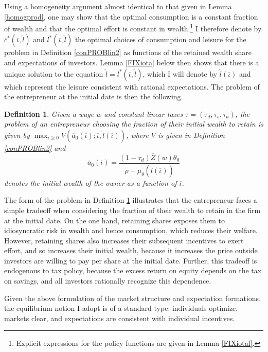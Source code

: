 \documentclass[11pt]{article}
\theoremstyle{plain}
\newtheorem{defn}{Definition}[section]
\begin{document}
Using a homogeneity argument almost identical to that given in Lemma \ref{homogprod}, one may show that the optimal consumption is a constant fraction of wealth and that the optimal effort is constant in wealth.\footnote{Explicit expressions for the policy functions are given in Lemma \ref{FIXiotal}.} I therefore denote by $\overline{c}^*(\overline{\iota}, \hat{l})$ and $l^*(\overline{\iota}, \hat{l})$ the optimal choices of consumption and leisure for the problem in Definition \ref{conPROBlin2} as functions of the retained wealth share and expectations of investors. Lemma \ref{FIXiota} below then shows that there is a unique solution to the equation $\hat{l} = l^*(\overline{\iota}, \hat{l})$, which I will denote by $\hat{l}(\overline{\iota})$ and which represent the leisure consistent with rational expectations. The problem of the entrepreneur at the initial date is then the following. 

\begin{defn} \label{conPROBlin3}
Given a wage $w$ and constant linear taxes $\tau = (\tau_d,\tau_s,\tau_a)$, the problem of an entrepreneur choosing the fraction of their initial wealth to retain is given by $\max_{\overline{\iota} \geq 0} V(\overline{a}_0(\overline{\iota}); \overline{\iota}, \hat{l}(\overline{\iota}))$, where 
$V$ is given in Definition \ref{conPROBlin2} and 
\begin{equation}
\overline{a}_0(\overline{\iota}) = \frac{(1-\tau_d)\overline{Z}(w)\theta_0}{\rho - \mu_{\theta}(\hat{l}(\overline{\iota}))}
\label{initiala}
\end{equation}
denotes the initial wealth of the owner as a function of $\overline{\iota}$.
\end{defn} %

The form of the problem in Definition \ref{conPROBlin3} illustrates that the entrepreneur faces a simple tradeoff when considering the fraction of their wealth to retain in the firm at the initial date. On the one hand, retaining shares exposes them to idiosyncratic risk in wealth and hence consumption, which reduces their welfare. However, retaining shares also increases their subsequent incentives to exert effort, and so increases their initial wealth, because it increases the price outside investors are willing to pay per share at the initial date. Further, this tradeoff is endogenous to tax policy, because the excess return on equity depends on the tax on savings, and all investors rationally recognize this dependence. 


Given the above formulation of the market structure and expectation formations, the equilibrium notion I adopt is of a standard type: individuals optimize, markets clear, and expectations are consistent with individual incentives. 
\end{document}
